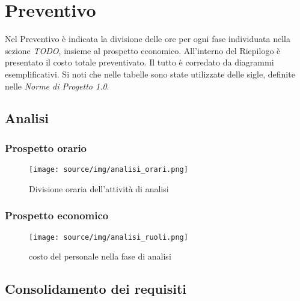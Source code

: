 \section{Preventivo}
Nel Preventivo è indicata la divisione delle ore per ogni fase individuata nella sezione \textit{TODO}, insieme al prospetto economico. All'interno del Riepilogo è presentato il costo totale preventivato. Il tutto è corredato da diagrammi esemplificativi.
Si noti che nelle tabelle sono state utilizzate delle sigle, definite nelle \textit{Norme di Progetto 1.0}. %
\subsection{Analisi}

    \subsubsection{Prospetto orario}
    \def\hourlycontent{
        {Andrea Breggion,6,14,3,0,0,6,29},
        {Matteo Falsetti,0,5,3,10,0,11,29},
        {Alessandro Flori,2,4,3,8,0,12,29},
        {Andrea Mascari,0,0,14,2,0,13,29},
        {Diego Piola,6,13,3,0,0,7,29},
        {Andrea Signori,12,6,4,0,0,7,29},
        {Damiano Zanardo,0,7,14,0,0,8,29},
        {Ore totali, 25, 51, 44, 19, 0, 64, 203},
    }
    
    \begin{figure}[H]
        \centering
        \texttt{[image: source/img/analisi\_orari.png]}
        \caption{Divisione oraria dell'attività di analisi}
    \end{figure}
    \subsubsection{Prospetto economico}
    \def\salarycontent{
        {Amministratore,49,20,980},
        {Analista,44,25,1100},
        {Progettista,20,22,440},
        {Programmatore,0,15,0},
        {Responsabile,26,30,780},
        {Verificatore,64,15,960},
        {Totale,203,127,4260},
    }
    
    \begin{figure}[H]
        \centering
        \texttt{[image: source/img/analisi\_ruoli.png]}
        \caption{costo del personale nella fase di analisi}
    \end{figure}
\subsection{Consolidamento dei requisiti}
